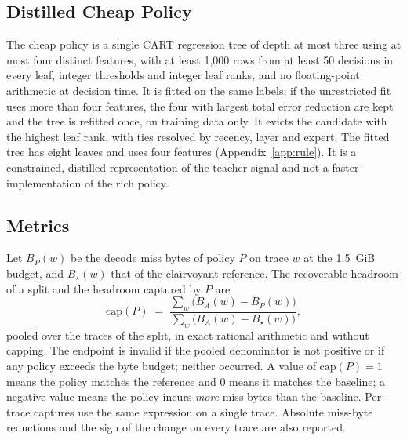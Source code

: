 \documentclass[11pt]{article}
\theoremstyle{plain}
\theoremstyle{definition}
\newcommand{\bel}{B_{\star}}
\begin{document}
\subsection{Distilled Cheap Policy}
\label{sec:cheap}
The cheap policy is a single CART regression tree of depth at most three using at most four distinct features, with at least 1{,}000 rows from at least 50 decisions in every leaf, integer thresholds and integer leaf ranks, and no floating-point arithmetic at decision time. It is fitted on the same labels; if the unrestricted fit uses more than four features, the four with largest total error reduction are kept and the tree is refitted once, on training data only. It evicts the candidate with the highest leaf rank, with ties resolved by recency, layer and expert. The fitted tree has eight leaves and uses four features (Appendix~\ref{app:rule}). It is a constrained, distilled representation of the teacher signal and not a faster implementation of the rich policy.

\subsection{Metrics}
\label{sec:metrics}
Let $B_P(w)$ be the decode miss bytes of policy $P$ on trace $w$ at the 1.5~GiB budget, and $\bel(w)$ that of the clairvoyant reference. The recoverable headroom of a split and the headroom captured by $P$ are
\begin{equation}
\mathrm{cap}(P) \;=\; \frac{\sum_{w}\bigl(B_A(w)-B_P(w)\bigr)}{\sum_{w}\bigl(B_A(w)-\bel(w)\bigr)},
\label{eq:capture}
\end{equation}
pooled over the traces of the split, in exact rational arithmetic and without capping. The endpoint is invalid if the pooled denominator is not positive or if any policy exceeds the byte budget; neither occurred. A value of $\mathrm{cap}(P) = 1$ means the policy matches the reference and $0$ means it matches the baseline; a negative value means the policy incurs \emph{more} miss bytes than the baseline. Per-trace captures use the same expression on a single trace. Absolute miss-byte reductions and the sign of the change on every trace are also reported.
\end{document}

